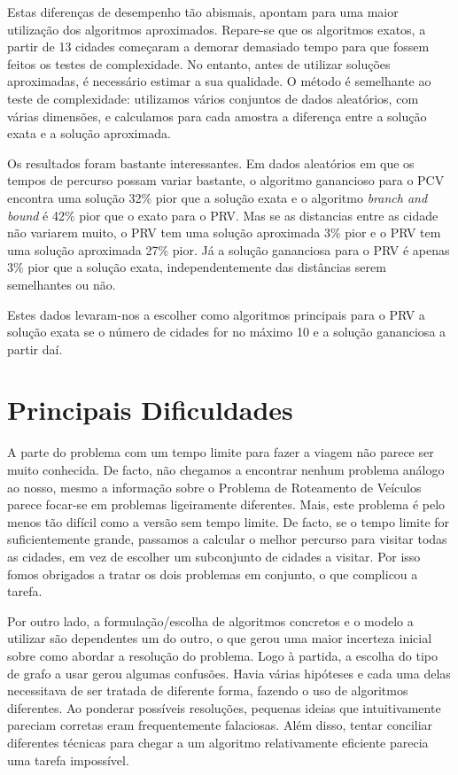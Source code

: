 \documentclass[12pt,a4paper,reqno]{report}
\numberwithin{equation}{section}
\begin{document}
Estas diferenças de desempenho tão abismais, apontam para uma maior utilização dos algoritmos aproximados. Repare-se que os algoritmos exatos, a partir de 13 cidades começaram a demorar demasiado tempo para que fossem feitos os testes de complexidade. No entanto, antes de utilizar soluções aproximadas, é necessário estimar a sua qualidade. O método é semelhante ao teste de complexidade: utilizamos vários conjuntos de dados aleatórios, com várias dimensões, e calculamos para cada amostra a diferença entre a solução exata e a solução aproximada.

Os resultados foram bastante interessantes. Em dados aleatórios em que os tempos de percurso possam variar bastante, o algoritmo ganancioso para o PCV encontra uma solução 32\% pior que a solução exata e o algoritmo \emph{branch and bound} é 42\% pior que o exato para o PRV. Mas se as distancias entre as cidade não variarem muito, o PRV tem uma solução aproximada 3\% pior e o PRV tem uma solução aproximada 27\% pior. Já a solução gananciosa para o PRV é apenas 3\% pior que a solução exata, independentemente das distâncias serem semelhantes ou não.

Estes dados levaram-nos a escolher como algoritmos principais para o PRV a solução exata se o número de cidades for no máximo 10 e a solução gananciosa a partir daí.

\chapter{Principais Dificuldades}

A parte do problema com um tempo limite para fazer a viagem não parece ser muito conhecida. De facto, não chegamos a encontrar nenhum problema análogo ao nosso, mesmo a informação sobre o Problema de Roteamento de Veículos parece focar-se em problemas ligeiramente diferentes. Mais, este problema é pelo menos tão difícil como a versão sem tempo limite. De facto, se o tempo limite for suficientemente grande, passamos a calcular o melhor percurso para visitar todas as cidades, em vez de escolher um subconjunto de cidades a visitar. Por isso fomos obrigados a tratar os dois problemas em conjunto, o que complicou a tarefa.

Por outro lado, a formulação/escolha de algoritmos concretos e o modelo a utilizar são dependentes um do outro, o que gerou uma maior incerteza inicial sobre como abordar a resolução do problema. Logo à partida, a escolha do tipo de grafo a usar gerou algumas confusões. Havia várias hipóteses e cada uma delas necessitava de ser tratada de diferente forma, fazendo o uso de algoritmos diferentes. Ao ponderar possíveis resoluções, pequenas ideias que intuitivamente pareciam corretas eram frequentemente falaciosas. Além disso, tentar conciliar diferentes técnicas para chegar a um algoritmo relativamente eficiente parecia uma tarefa impossível.
\end{document}
